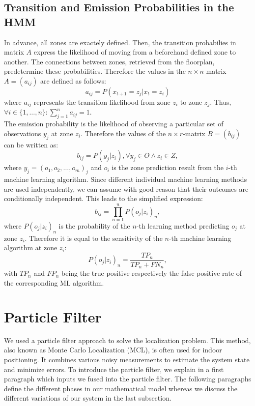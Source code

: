 \subsection{Transition and Emission Probabilities in the HMM}
In advance, all zones are exactely defined. Then, the transition probabilies in matrix $A$ express the likelihood of moving from a beforehand defined zone to another. The connections between zones, retrieved from the floorplan, predetermine these probabilities. Therefore the values in the $n\times n$-matrix $A = (a_{ij})$ are defined as follows:
$$a_{ij} = P(x_{t+1} = z_{j} | x_{t} = z_{i})$$
where $a_{ij}$ represents the transition likelihood from zone $z_{i}$ to zone $z_{j}$. Thus, $\forall i \in \{1,\dots,n\}: \sum_{j=1}^{n} a_{ij} = 1$.\\
The emission probability is the likelihood of observing a particular set of observations $y_{j}$ at zone $z_{i}$. Therefore the values of the $n\times r$-matrix $B = (b_{ij})$ can be written as:
$$b_{ij} = P(y_{j} | z_{i}), \forall y_{j} \in O \land z_{i} \in Z,$$
where $y_{j} = (o_1, o_2, \dots, o_m)_j$ and $o_i$ is the zone prediction result from the $i$-th machine learning algorithm.
Since different individual machine learning methods are used independently, we can assume with good reason that their outcomes are conditionally independent. This leads to the simplified expression:
$$b_{ij} = \prod^{n}_{n=1} P(o_{j} | z_{i})_{n},$$
where $P(o_{j} | z_{i})_{n}$ is the probability of the $n$-th learning method predicting $o_{j}$ at zone $z_{i}$. Therefore it is equal to the sensitivity of the $n$-th machine learning algorithm at zone $z_{i}$:
$$P(o_{j} | z_{i})_{n} = \frac{TP_{n}}{TP_{n} + FN_{n}},$$
with $TP_{n}$ and $FP_{n}$ being the true positive respectively the false positive rate of the corresponding ML algorithm.



\section{Particle Filter}
We used a particle filter approach to solve the localization problem. This method, also known as Monte Carlo Localization (MCL), is often used for indoor positioning. It combines various noisy measurements to estimate the system state and minimize errors. To introduce the particle filter, we explain in a first paragraph which inputs we fused into the particle filter. The following paragraphs define the different phases in our mathematical model whereas we discuss the different variations of our system in the last subsection.

